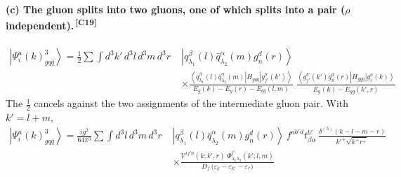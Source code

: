 \documentclass[11pt]{article}
\newcommand{\eps}{\varepsilon}
\newcommand{\dthree}{\delta^{(3)}}
\newcommand{\ket}[1]{\left|#1\right\rangle}
\newcommand{\bra}[1]{\left\langle#1\right|}
\newcommand{\Ph}{\Phi}
\newcommand{\Vg}{\mathcal{V}}
\newcommand{\qk}[3]{q^{#1}_{#2}(#3)}
\newcommand{\aqk}[3]{\bar q^{#1}_{#2}(#3)}
\newcommand{\gl}[3]{g^{#1}_{#2}(#3)}
\newcommand{\chg}[1]{{\color{blue!70!black}\textsuperscript{\,[C#1]}}}
\begin{document}
\paragraph{(c) The gluon splits into two gluons, one of which splits into a pair
($\rho$ independent).\chg{19}}
\begin{center}
\end{center}
\begin{align}
\ket{\Psi^{a}_{i}(k)^{3}_{gq\bar q}}=\frac12\sum\int\! d^{3}k'\,d^{3}l\,d^{3}m\,d^{3}r\;
&\ket{\qk{\beta}{\lambda_{1}}{l}\aqk{\alpha}{\lambda_{2}}{m}\gl{d}{n}{r}}
\nonumber\\&\times
\frac{\bra{\qk{\beta}{\lambda_{1}}{l}\aqk{\alpha}{\lambda_{2}}{m}}H_{gq\bar q}\ket{\gl{b'}{j'}{k'}}}
{E_{g}(k)-E_{g}(r)-E_{q\bar q}(l,m)}\;
\frac{\bra{\gl{b'}{j'}{k'}\gl{d}{n}{r}}H_{ggg}\ket{\gl{a}{i}{k}}}
{E_{g}(k)-E_{gg}(k',r)}
\end{align}
The $\tfrac12$ cancels against the two assignments of the intermediate gluon pair. With $k'=l+m$,
\begin{align}
\ket{\Psi^{a}_{i}(k)^{3}_{gq\bar q}}=\frac{ig^{2}}{64\pi^{3}}\sum\int\! d^{3}l\,d^{3}m\,d^{3}r\;
&\ket{\qk{\beta}{\lambda_{1}}{l}\aqk{\alpha}{\lambda_{2}}{m}\gl{d}{n}{r}}\,
f^{ab'd}t^{b'}_{\beta\alpha}\,\frac{\dthree(k-l-m-r)}{k'^{+}\sqrt{k^{+}r^{+}}}
\nonumber\\&\times
\frac{\Vg^{ij'n}(k;k',r)\;\Ph^{j'}_{\lambda_{1}\lambda_{2}}(k';l,m)}
{D_{f}\,\big(\eps_{k}-\eps_{k'}-\eps_{r}\big)}
\label{eq:B2c}
\end{align}
\end{document}
